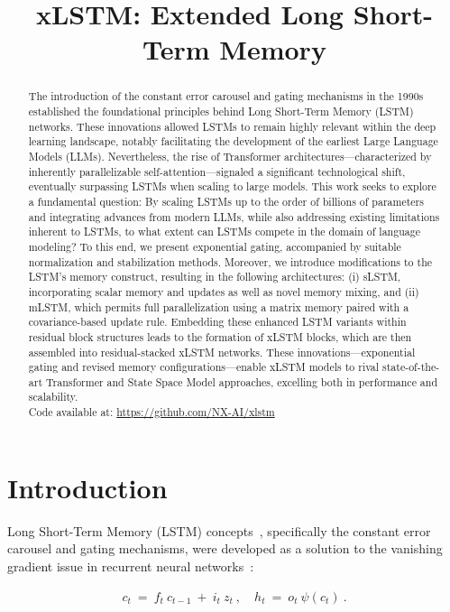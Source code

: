 \title{xLSTM: Extended Long Short-Term Memory}

\begin{abstract}
The introduction of the constant error carousel and gating mechanisms in the 1990s established the foundational principles behind Long Short-Term Memory (LSTM) networks. These innovations allowed LSTMs to remain highly relevant within the deep learning landscape, notably facilitating the development of the earliest Large Language Models (LLMs). Nevertheless, the rise of Transformer architectures—characterized by inherently parallelizable self-attention—signaled a significant technological shift, eventually surpassing LSTMs when scaling to large models. This work seeks to explore a fundamental question: By scaling LSTMs up to the order of billions of parameters and integrating advances from modern LLMs, while also addressing existing limitations inherent to LSTMs, to what extent can LSTMs compete in the domain of language modeling? To this end, we present exponential gating, accompanied by suitable normalization and stabilization methods. Moreover, we introduce modifications to the LSTM’s memory construct, resulting in the following architectures: (i) sLSTM, incorporating scalar memory and updates as well as novel memory mixing, and (ii) mLSTM, which permits full parallelization using a matrix memory paired with a covariance-based update rule. Embedding these enhanced LSTM variants within residual block structures leads to the formation of xLSTM blocks, which are then assembled into residual-stacked xLSTM networks. These innovations—exponential gating and revised memory configurations—enable xLSTM models to rival state-of-the-art Transformer and State Space Model approaches, excelling both in performance and scalability.\\
Code available at: \url{https://github.com/NX-AI/xlstm}
\end{abstract}

\section{Introduction}
\label{sec:intro}

Long Short-Term Memory (LSTM) concepts~\citep{Hochreiter:91,Hochreiter:97nips,Hochreiter:97}, specifically the constant error carousel and gating mechanisms, were developed as a solution to the vanishing gradient issue in recurrent neural networks~\citep{Hochreiter:91,Hochreiter:00book}:

\begin{align}
\label{eq:lstm_idea}
  c_t \ = \ f_t \ c_{t-1} \ + \ 
          i_t \  z_t \ , \quad  
          h_t \ = \ o_t \ \psi({c_t}) \ . 
\end{align}

